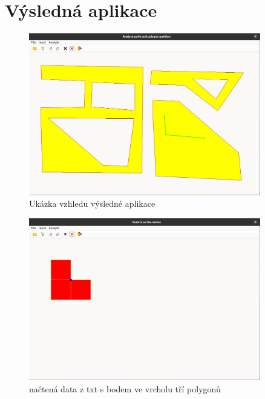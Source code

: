 \newpage
\section{Výsledná aplikace}

\begin{figure}[H]
    \centering
    \includegraphics[width=0.9\textwidth]{images/ukazka_aplikace.JPG}
    \caption{Ukázka vzhledu výsledné aplikace}
\end{figure}

\begin{figure}[H]
    \centering
    \includegraphics[width=0.9\textwidth]{images/data_txt_vertex.JPG}
    \caption{načtená data z txt s bodem ve vrcholu tří polygonů}
\end{figure}

